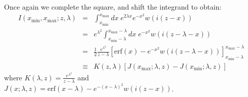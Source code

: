 \documentclass[a4paper,10pt,twosided]{article}
\begin{document}
Once again we complete the square, and shift the integrand to obtain:
\begin{eqnarray*}
       I(x_\mathrm{min},x_\mathrm{max};z,\lambda) &=& \int_{x_\mathrm{min}}^{x_\mathrm{max}} dx\; e^{2\lambda x} e^{-x^2} w\left( i(z-x)\right) 
        \\            &=& e^{\lambda^2}\int_{x_\mathrm{min}-\lambda}^{x_\mathrm{max}-\lambda} dx \;  e^{-x^2} w\left(i\left(z-\lambda-x\right) \right)
        \\            &=&\frac{1}{2} \frac{e^{\lambda^2}}{z-\lambda} \left[ \mathrm{erf}\left( x \right) - e^{-x^2}w\left(i\left(z-\lambda-x \right) \right) \right]_{x_\mathrm{min}-\lambda}^{x_\mathrm{max}-\lambda}
        \\            &\equiv& K(z,\lambda) \left[  J(x_\mathrm{max};\lambda,z) - J(x_\mathrm{min};\lambda,z)  \right]
\end{eqnarray*}
where $K(\lambda,z)=\frac{e^{\lambda^2}}{z-\lambda}$ and $J(x;\lambda,z)=\mathrm{erf}\left(x-\lambda\right)-e^{-\left(x-\lambda\right)^2}w\left(i\left(z-x\right) \right)$. 
\end{document}
